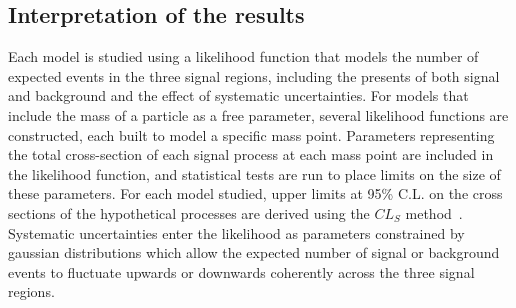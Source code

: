 
\clearpage
\subsection{Interpretation of the results}\label{sect:interpretation}

Each model is studied using a likelihood function that models the number of expected events in the three signal regions, including the presents of both signal and background and the effect of systematic uncertainties.
For models that include the mass of a particle as a free parameter, several likelihood functions are constructed, each built to model a specific mass point.
Parameters representing the total cross-section of each signal process at each mass point are included in the likelihood function, and statistical tests are run to place limits on the size of these parameters.
For each model studied, upper limits at 95\% C.L. on the cross sections of the hypothetical processes are derived using the $CL_S$ method~\cite{Junk:1999kv,0954-3899-28-10-313}.
Systematic uncertainties enter the likelihood as parameters constrained by gaussian distributions which allow the expected number of signal or background events to fluctuate upwards or downwards coherently across the three signal regions.

